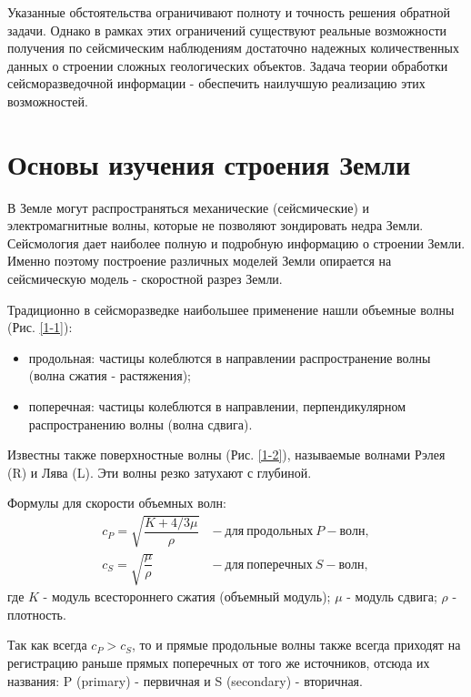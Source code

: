 Указанные обстоятельства ограничивают полноту и точность решения обратной задачи. Однако в рамках этих ограничений существуют реальные возможности получения по сейсмическим наблюдениям достаточно надежных количественных данных о строении сложных геологических объектов. Задача теории обработки сейсморазведочной информации - обеспечить наилучшую реализацию этих возможностей.



\section*{Основы изучения строения Земли}



В Земле могут распространяться механические (сейсмические) и электромагнитные волны, которые не позволяют зондировать недра Земли. Сейсмология дает наиболее полную и подробную информацию о строении Земли. Именно поэтому построение различных моделей Земли опирается на сейсмическую модель - скоростной разрез Земли.

Традиционно в сейсморазведке наибольшее применение нашли объемные волны (Рис. \ref{1-1}):
\begin{itemize}
	\item продольная: частицы колеблются в направлении распространение волны (волна сжатия - растяжения);
	\item поперечная: частицы колеблются в направлении, перпендикулярном распространению волны (волна сдвига).
\end{itemize}
Известны также поверхностные волны (Рис. \ref{1-2}), называемые волнами Рэлея (R) и Лява (L). Эти волны резко затухают с глубиной.

Формулы для скорости объемных волн:
\begin{equation}
	\begin{aligned}
	c_P = \sqrt{\dfrac{K + 4/3\mu}{\rho}}~&-~для~продольных~P-волн, \\
	c_S = \sqrt{\dfrac{\mu}{\rho}}~&-~для~поперечных~S-волн,
	\end{aligned}
\end{equation}
где $K$ - модуль всестороннего сжатия (объемный модуль); $\mu$ - модуль сдвига; $\rho$ - плотность.

Так как всегда $c_P > c_S$, то и прямые продольные волны также всегда приходят на регистрацию раньше прямых поперечных от того же источников, отсюда их названия: P (primary) - первичная и S (secondary) - вторичная.

